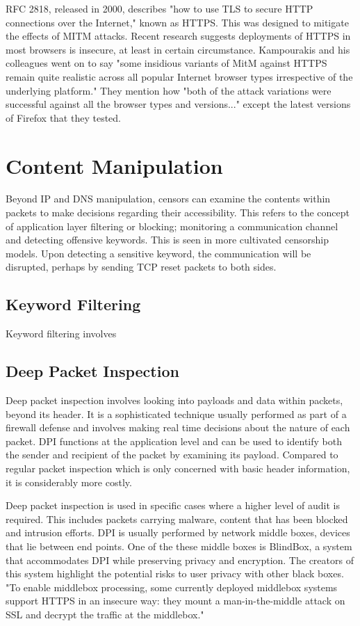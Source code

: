 RFC 2818, released in 2000, describes "how to use TLS to secure HTTP connections over the Internet," \cite{rfc2818}known as HTTPS. This was designed to mitigate the effects of MITM attacks. Recent research suggests deployments of HTTPS in most browsers is insecure, at least in certain circumstance. Kampourakis and his colleagues went on to say "some insidious variants of MitM against HTTPS remain quite realistic across all popular Internet browser types irrespective of the underlying platform." \cite{MITMvHTTPS} 
They mention how "both of the attack variations were successful against all the browser types and versions..." except the latest versions of Firefox that they tested.

\section{Content Manipulation}
Beyond IP and DNS manipulation, censors can examine the contents within packets to make decisions regarding their accessibility. This refers to the concept of application layer filtering or blocking; monitoring a communication channel and detecting offensive keywords. This is seen in more cultivated censorship models. Upon detecting a sensitive keyword, the communication will be disrupted, perhaps by sending TCP reset packets to both sides.

\subsection{Keyword Filtering}
Keyword filtering involves 

\subsection{Deep Packet Inspection}

Deep packet inspection involves looking into payloads and data within packets, beyond its header. It is a sophisticated technique usually performed as part of a firewall defense and involves making real time decisions about the nature of each packet. DPI functions at the application level and can be used to identify both the sender and recipient of the packet by examining its payload. Compared to regular packet inspection which is only concerned with basic header information, it is considerably more costly. 

Deep packet inspection is used in specific cases where a higher level of audit is required. This includes packets carrying malware, content that has been blocked and intrusion efforts. DPI is usually performed by network middle boxes, devices that lie between end points. One of the these middle boxes is BlindBox, a system that accommodates DPI while preserving privacy and encryption. The creators of this system highlight the potential risks to user privacy with other black boxes. "To enable middlebox processing, some currently deployed middlebox systems support HTTPS in
an insecure way: they mount a man-in-the-middle attack on SSL and decrypt the traffic at the middlebox." \cite{sherry2015blindbox}

